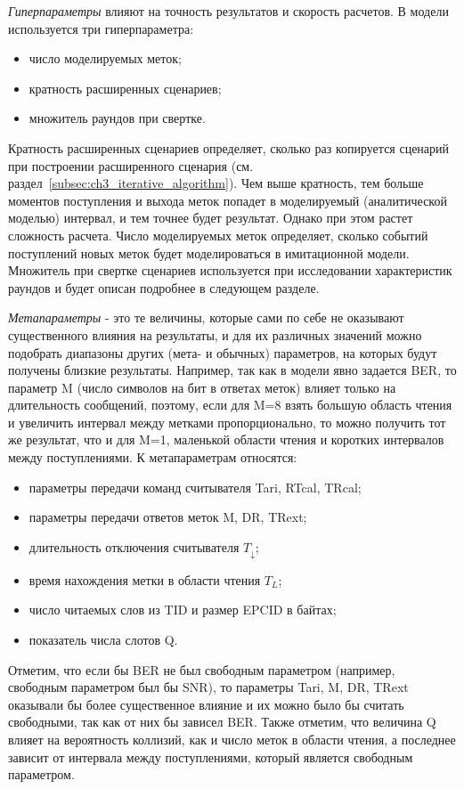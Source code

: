 \textit{Гиперпараметры} влияют на точность результатов и скорость расчетов. В модели используется три гиперпараметра:
\begin{itemize}
	\item число моделируемых меток;
	\item кратность расширенных сценариев;
	\item множитель раундов при свертке.
\end{itemize}
Кратность расширенных сценариев определяет, сколько раз копируется сценарий при построении расширенного сценария (см. раздел~\ref{subsec:ch3_iterative_algorithm}). Чем выше кратность, тем больше моментов поступления и выхода меток попадет в моделируемый (аналитической моделью) интервал, и тем точнее будет результат. Однако при этом растет сложность расчета. Число моделируемых меток определяет, сколько событий поступлений новых меток будет моделироваться в имитационной модели. Множитель при свертке сценариев используется при исследовании характеристик раундов и будет описан подробнее в следующем разделе.

\textit{Метапараметры} - это те величины, которые сами по себе не оказывают существенного влияния на результаты, и для их различных значений можно подобрать диапазоны других (мета- и обычных) параметров, на которых будут получены близкие результаты. Например, так как в модели явно задается BER, то параметр M (число символов на бит в ответах меток) влияет только на длительность сообщений, поэтому, если для M=8 взять большую область чтения и увеличить интервал между метками пропорционально, то можно получить тот же результат, что и для M=1, маленькой области чтения и коротких интервалов между поступлениями. К метапараметрам относятся:

\begin{itemize}
	\item параметры передачи команд считывателя Tari, RTcal, TRcal;
	\item параметры передачи ответов меток M, DR, TRext;
	\item длительность отключения считывателя $T_{\downarrow}$;
	\item время нахождения метки в области чтения $T_L$;
	\item число читаемых слов из TID и размер EPCID в байтах;
	\item показатель числа слотов Q.
\end{itemize}
Отметим, что если бы BER не был свободным параметром (например, свободным параметром был бы SNR), то параметры Tari, M, DR, TRext оказывали бы более существенное влияние и их можно было бы считать свободными, так как от них бы зависел BER. Также отметим, что величина Q влияет на вероятность коллизий, как и число меток в области чтения, а последнее зависит от интервала между поступлениями, который является свободным параметром.


